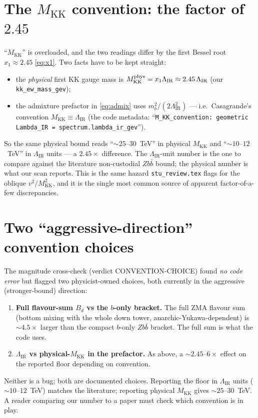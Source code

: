 \documentclass[11pt]{article}
\newcommand{\MKK}{M_{\mathrm{KK}}}
\newcommand{\LIR}{\Lambda_{\mathrm{IR}}}
\newcommand{\vev}{v}
\newcommand{\code}[1]{\texttt{#1}}
\theoremstyle{definition}
\begin{document}
\section{The $\MKK$ convention: the factor of $2.45$}
\label{sec:Mconvention}
``$\MKK$'' is overloaded, and the two readings differ by the first Bessel root
$x_1\approx 2.45$ \eqref{eq:x1}. Two facts have to be kept straight:
\begin{itemize}[leftmargin=1.4em]
\item the \emph{physical} first KK gauge mass is
$\MKK^{\rm phys} = x_1\LIR \approx 2.45\,\LIR$ (our \code{kk\_ew\_mass\_gev});
\item the admixture prefactor in \eqref{eq:admix} uses $m_b^2/(2\LIR^2)$ ---
i.e.\ Casagrande's convention $\MKK \equiv \LIR$ (the code metadata:
``\code{M\_KK\_convention: geometric Lambda\_IR = spectrum.lambda\_ir\_gev}'').
\end{itemize}
So the same physical bound reads ``$\sim 25$--$30$~TeV'' in physical $\MKK$ and
``$\sim 10$--$12$~TeV'' in $\LIR$ units --- a $2.45\times$ difference. The
$\LIR$-unit number is the one to compare against the literature non-custodial
$Zb\bar b$ bound; the physical number is what our scan reports. This is the same
hazard \code{stu\_review.tex} flags for the oblique $\vev^2/\MKK^2$, and it is the
single most common source of apparent factor-of-a-few discrepancies.

\section{Two ``aggressive-direction'' convention choices}
\label{sec:aggressive}
The magnitude cross-check (verdict CONVENTION-CHOICE) found \emph{no code error}
but flagged two physicist-owned choices, both currently in the aggressive
(stronger-bound) direction:
\begin{enumerate}[leftmargin=1.8em]
\item \textbf{Full flavour-sum $B_d$ vs the $b$-only bracket.} The full ZMA
flavour sum (bottom mixing with the whole down tower, anarchic-Yukawa-dependent)
is $\sim 4.5\times$ larger than the compact $b$-only $Zb\bar b$ bracket. The full
sum is what the code uses.
\item \textbf{$\LIR$ vs physical-$\MKK$ in the prefactor.} As above, a
$\sim 2.45$--$6\times$ effect on the reported floor depending on convention.
\end{enumerate}
Neither is a bug; both are documented choices. Reporting the floor in $\LIR$
units ($\sim 10$--$12$~TeV) matches the literature; reporting physical $\MKK$
gives $\sim 25$--$30$~TeV. A reader comparing our number to a paper must check
which convention is in play.
\end{document}
